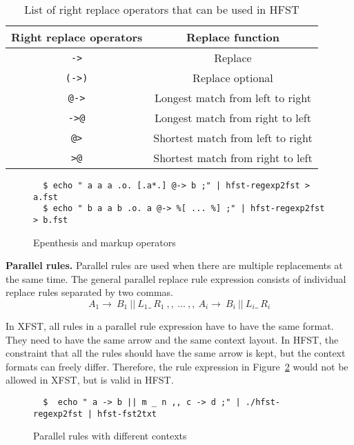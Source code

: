 \documentclass{llncs}
\begin{document}
\begin{table} [h!]
  \centering
  \caption{List of right replace operators that can be used in HFST}
  \begin{tabular}{| c | c |} 
    \hline
    Right replace operators & Replace function \\ \hline\hline
    \verb!->!   & Replace \\ \hline
    \verb!(->)! & Replace optional \\ \hline
    \verb!@->!  & Longest match from left to right \\ \hline
    \verb!->@!  & Longest match from right to left \\ \hline
    \verb!@>!   & Shortest match from left to right \\ \hline
    \verb!>@!   & Shortest match from right to left \\ \hline
  \end{tabular}
  \label{tab:replace_operators}
\end{table}



\begin{figure} [h!]
{\footnotesize
\begin{verbatim}
  $ echo " a a a .o. [.a*.] @-> b ;" | hfst-regexp2fst > a.fst
  $ echo " b a a b .o. a @-> %[ ... %] ;" | hfst-regexp2fst > b.fst
\end{verbatim}
}
\caption{Epenthesis and markup operators}
\label{fig:epenthesis_markup}
\end{figure}



\textbf{Parallel rules.} Parallel rules are used when there are 
multiple replacements at the same time. The general parallel replace rule expression 
consists of individual replace rules separated by two commas.
\begin{equation}
  A_1 \rightarrow\ B_1\ ||\ L_1 \_\  R_1\ ,,\ \ldots\ ,,\ A_i \rightarrow\ B_i\ ||\ L_i \_\ R_i
\end{equation}

In XFST, all rules in a parallel rule expression have to have the same format. 
They need to have the same arrow and the same context layout. 
In HFST, the constraint that all the rules should have the same arrow is kept, 
but the context formats can freely differ. 
Therefore, the rule expression in Figure~\ref{fig:parallel_rules} 
would not be allowed in XFST, but is valid in HFST.
\begin{figure}
{\footnotesize
\begin{verbatim}
  $  echo " a -> b || m _ n ,, c -> d ;" | ./hfst-regexp2fst | hfst-fst2txt
\end{verbatim}
}
\caption{Parallel rules with different contexts}
\label{fig:parallel_rules}
\end{figure}
\end{document}
